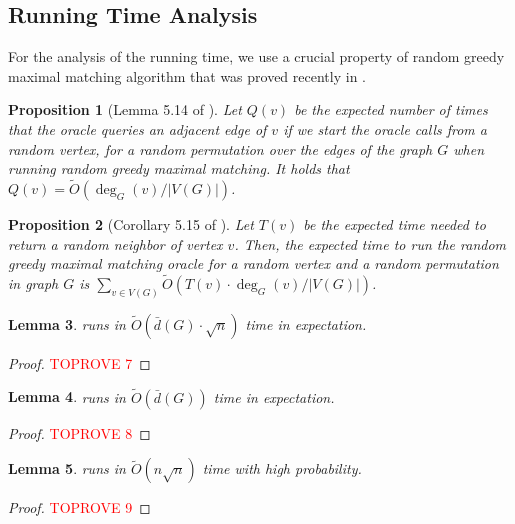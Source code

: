 \documentclass[letterpaper,11pt]{article}
\newcommand{\wt}[1]{\ensuremath{\widetilde{#1}}}
\newtheorem{lemma}{Lemma}[section]
\newtheorem{proposition}[lemma]{Proposition}
\begin{document}
\subsection{Running Time Analysis}

For the analysis of the running time, we use a crucial property of random greedy maximal matching algorithm that was proved recently in \cite{steiner-tree-itcs}.



\begin{proposition}[Lemma 5.14 of \cite{steiner-tree-itcs}]\label{prop:outdegree-bound-1}
    Let $Q(v)$ be the expected number of times that the oracle queries an adjacent edge of $v$ if we start the oracle calls from a random vertex, for a random permutation over the edges of the graph $G$ when running random greedy maximal matching. It holds that $Q(v) = \wt{O}(\deg_G(v) / |V(G)|)$.
\end{proposition}



\begin{proposition}[Corollary 5.15 of \cite{steiner-tree-itcs}]\label{prop:outdegree-bound}
    Let $T(v)$ be the expected time needed to return a random neighbor of vertex $v$. Then, the expected time to run the random greedy maximal matching oracle for a random vertex and a random permutation in graph $G$ is $\sum_{v \in V(G)} \wt{O}(T(v) \cdot \deg_G(v) / |V(G)|)$.
\end{proposition}








\begin{lemma}\label{lem:first-alg-time}
     runs in $\widetilde{O}( \bar{d}(G) \cdot \sqrt{n})$ time in expectation.
\end{lemma}
\begin{proof}\textcolor{red}{TOPROVE 7}\end{proof}


\begin{lemma}\label{lem:second-alg-time}
     runs in $\widetilde{O}(\bar{d}(G))$ time in expectation.
\end{lemma}
\begin{proof}\textcolor{red}{TOPROVE 8}\end{proof}



\begin{lemma}\label{lem:final-time-1}
     runs in $\widetilde{O}(n\sqrt{n})$ time with high probability.
\end{lemma}
\begin{proof}\textcolor{red}{TOPROVE 9}\end{proof}
\end{document}

